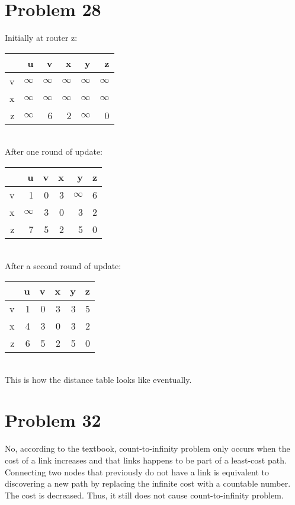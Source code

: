 \documentclass[titlepage, paper=a4, fontsize=11pt]{scrartcl} %
\numberwithin{equation}{section} %
\numberwithin{table}{section} %
\begin{document}

\section*{Problem 28}
Initially at router z:
\begin{tabular}{ r | r | r | r | r | r }
  \hline
  & u & v & x & y & z \\
  \hline
  v & $\infty$ & $\infty$ & $\infty$ & $\infty$ & $\infty$ \\
  x & $\infty$ & $\infty$ & $\infty$ & $\infty$ & $\infty$ \\
  z & $\infty$ & 6 & 2 & $\infty$ & 0 \\
  \hline
\end{tabular}
\\

After one round of update:
\begin{tabular}{ r | r | r | r | r | r }
  \hline
  & u & v & x & y & z \\
  \hline
  v & 1 & 0 & 3 & $\infty$ & 6 \\
  x & $\infty$ & 3 & 0 & 3 & 2 \\
  z & 7 & 5 & 2 & 5 & 0 \\
  \hline
\end{tabular}
\\

After a second round of update:
\begin{tabular}{ r | r | r | r | r | r }
  \hline
  & u & v & x & y & z \\
  \hline
  v & 1 & 0 & 3 & 3 & 5 \\
  x & 4 & 3 & 0 & 3 & 2 \\
  z & 6 & 5 & 2 & 5 & 0 \\
  \hline
\end{tabular}
\\

This is how the distance table looks like eventually. \\




\section*{Problem 32}
No, according to the textbook, count-to-infinity problem only occurs when the cost of a link increases and that links happens to be part of a least-cost path. Connecting two nodes that previously do not have a link is equivalent to discovering a new path by replacing the infinite cost with a countable number. The cost is decreased. Thus, it still does not cause count-to-infinity problem. \\
\end{document}
